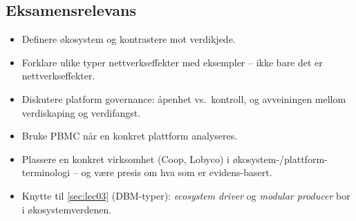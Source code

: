 \subsection{Eksamensrelevans}
\begin{itemize}
  \item Definere økosystem og kontrastere mot verdikjede.
  \item Forklare ulike typer nettverkseffekter med eksempler -- ikke bare
    \guillemotleft{}det er nettverkseffekter\guillemotright{}.
  \item Diskutere platform governance: åpenhet vs.\ kontroll, og avveiningen
    mellom verdiskaping og verdifangst.
  \item Bruke PBMC når en konkret plattform analyseres.
  \item Plassere en konkret virksomhet (Coop, Lobyco) i økosystem-/plattform-
    terminologi -- og være presis om hva som er evidens-basert.
  \item Knytte til \autoref{sec:lec03} (DBM-typer): \emph{ecosystem driver} og
    \emph{modular producer} bor i økosystemverdenen.
\end{itemize}
